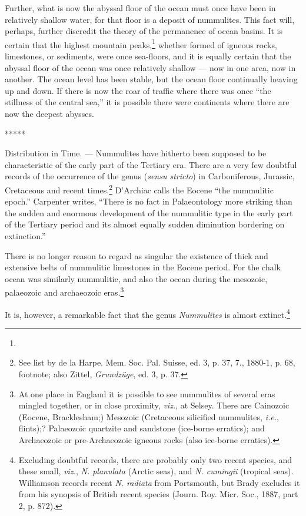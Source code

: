 \documentclass[a4paper, 12pt, oneside]{article}
\begin{document}
Further, what is now the abyssal floor of the ocean must once have been in relatively shallow water, for that floor is a deposit of nummulites. This fact will, perhaps, further discredit the theory of the permanence of ocean basins. It is certain that the highest mountain peaks,\footnote{} whether formed of igneous rocks, limestones, or sediments, were once sea-floors, and it is equally certain that the abyssal floor of the ocean was once relatively shallow --- now in one area, now in another. The ocean level has been stable, but the ocean floor continually heaving up and down. If there is now the roar of traffic where there was once ``the stillness of the central sea,'' it is possible there were continents where there are now the deepest abysses.

\centerline{*\hspace{15mm}*\hspace{15mm}*\hspace{15mm}*\hspace{15mm}*}
\bigskip

Distribution in Time. --- Nummulites have hitherto been supposed to be characteristic of the early part of the Tertiary era. There are a very few doubtful records of the occurrence of the genus (\emph{sensu stricto}) in Carboniferous, Jurassic, Cretaceous and recent times.\footnote{See list by de la Harpe. Mem. Soc. Pal. Suisse, ed. 3, p. 37, 7., 1880-1, p. 68, footnote; also Zittel, \emph{Grundzüge}, ed. 3, p. 37.} D'Archiac calls the Eocene ``the nummulitic epoch.'' Carpenter writes, ``There is no fact in Palaeontology more striking than the sudden and enormous development of the nummulitic type in the early part of the Tertiary period and its almost equally sudden diminution bordering on extinction.''

There is no longer reason to regard as singular the existence of thick and extensive belts of nummulitic limestones in the Eocene period. For the chalk ocean was similarly nummulitic, and also the ocean during the mesozoic, palaeozoic and archaeozoic eras.\footnote{At one place in England it is possible to see nummulites of several eras mingled together, or in close proximity, \emph{viz.}, at Selsey. There are Cainozoic (Eocene, Bracklesham;) Mesozoic (Cretaceous silicified nummulites, \emph{i.e.}, flints);? Palaeozoic quartzite and sandstone (ice-borne erratics); and Archaeozoic or pre-Archaeozoic igneous rocks (also ice-borne erratics).}

It is, however, a remarkable fact that the genus \emph{Nummulites} is almost extinct.\footnote{Excluding doubtful records, there are probably only two recent species, and these small, \emph{viz.}, \emph{N. planulata} (Arctic seas), and \emph{N. cumingii} (tropical seas). Williamson records recent \emph{N. radiata} from Portsmouth, but Brady excludes it from his synopsis of British recent species (Journ. Roy. Micr. Soc., 1887, part 2, p. 872).}
\end{document}

